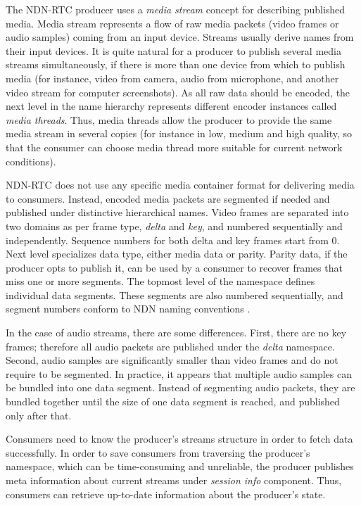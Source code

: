 \documentclass{icn/sig-alternate-2012} %
\newcommand{\ndnrtcName}{NDN-RTC} %
\begin{document}
The \ndnrtcName{} producer uses a \textit{media stream} concept for describing published media. Media stream represents a flow of raw media packets (video frames or audio samples) coming from an input device. Streams usually derive names from their input devices. It is quite natural for a producer to publish several media streams simultaneously, if there is more than one device from which to publish media (for instance, video from camera, audio from microphone, and another video stream for computer screenshots). As all raw data should be encoded, the next level in the name hierarchy represents different encoder instances called \textit{media threads}. Thus, media threads allow the producer to provide the same media stream in several copies (for instance in low, medium and high quality, so that the consumer can choose media thread more suitable for current network conditions).


\ndnrtcName{} does not use any specific media container format for delivering media to consumers. Instead, encoded media packets are segmented if needed and published under distinctive hierarchical names. Video frames are separated into two domains as per frame type, \textit{delta} and \textit{key}, and numbered sequentially and independently. Sequence numbers for both delta and key frames start from 0. Next level specializes data type, either media data or parity. Parity data, if the producer opts to publish it, can be used by a consumer to recover frames that miss one or more segments. The topmost level of the namespace defines individual data segments. These segments are also numbered sequentially, and segment numbers conform to NDN naming conventions \cite{ndn_naming}.

In the case of audio streams, there are some differences. First, there are no key frames; therefore all audio packets are published under the \textit{delta} namespace. Second, audio samples are significantly smaller than video frames and do not require to be segmented. In practice, it appears that multiple audio samples can be bundled into one data segment. Instead of segmenting audio packets, they are bundled together until the size of one data segment is reached, and published only after that.

Consumers need to know the producer's streams structure in order to fetch data successfully. In order to save consumers from traversing the producer's namespace, which can be time-consuming and unreliable, the producer publishes meta information about current streams under \textit{session info} component. Thus, consumers can retrieve up-to-date information about the producer's state.
\end{document}
